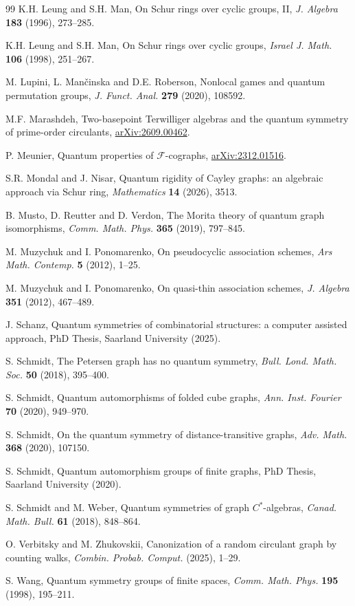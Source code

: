 \documentclass[11pt]{amsart}
\newcommand{\blackarxiv}[1]{{\hypersetup{urlcolor=black}\href{https://arxiv.org/pdf/#1}{arXiv:#1}}}
\begin{document}
\begin{thebibliography}{99}
K.H. Leung and S.H. Man, On Schur rings over cyclic groups, II, {\em J. Algebra} {\bf 183} (1996), 273--285.

K.H. Leung and S.H. Man, On Schur rings over cyclic groups, {\em Israel J. Math.} {\bf 106} (1998), 251--267.

M. Lupini, L. Man\v{c}inska and D.E. Roberson, Nonlocal games and quantum permutation groups, {\em J. Funct. Anal.} {\bf 279} (2020), 108592.

M.F. Marashdeh, Two-basepoint Terwilliger algebras and the quantum symmetry of prime-order circulants, \blackarxiv{2609.00462}.

P. Meunier, Quantum properties of $\mathcal F$-cographs, \blackarxiv{2312.01516}.

S.R. Mondal and J. Nisar, Quantum rigidity of Cayley graphs: an algebraic approach via Schur ring, {\em Mathematics} {\bf 14} (2026), 3513.

B. Musto, D. Reutter and D. Verdon, The Morita theory of quantum graph isomorphisms, {\em Comm. Math. Phys.} {\bf 365} (2019), 797--845.

M. Muzychuk and I. Ponomarenko, On pseudocyclic association schemes, {\em Ars Math. Contemp.} {\bf 5} (2012), 1--25.

M. Muzychuk and I. Ponomarenko, On quasi-thin association schemes, {\em J. Algebra} {\bf 351} (2012), 467--489.

J. Schanz, Quantum symmetries of combinatorial structures: a computer assisted approach, PhD Thesis, Saarland University (2025).

S. Schmidt, The Petersen graph has no quantum symmetry, {\em Bull. Lond. Math. Soc.} {\bf 50} (2018), 395--400.

S. Schmidt, Quantum automorphisms of folded cube graphs, {\em Ann. Inst. Fourier} {\bf 70} (2020), 949--970.

S. Schmidt, On the quantum symmetry of distance-transitive graphs, {\em Adv. Math.} {\bf 368} (2020), 107150.

S. Schmidt, Quantum automorphism groups of finite graphs, PhD Thesis, Saarland University (2020).

S. Schmidt and M. Weber, Quantum symmetries of graph $C^*$-algebras, {\em Canad. Math. Bull.} {\bf 61} (2018), 848--864.

O. Verbitsky and M. Zhukovskii, Canonization of a random circulant graph by counting walks, {\em Combin. Probab. Comput.} (2025), 1--29.

S. Wang, Quantum symmetry groups of finite spaces, {\em Comm. Math. Phys.} {\bf 195} (1998), 195--211.

\end{thebibliography}
\end{document}
